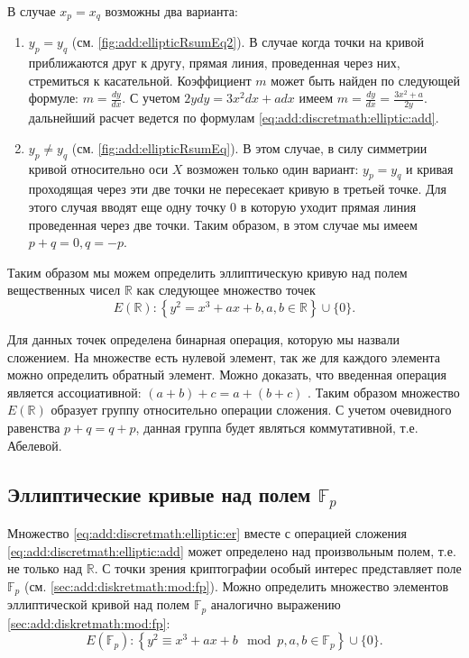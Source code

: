 В случае $x_p = x_q$ возможны два варианта:
\begin{enumerate}
\item $y_p = y_q$ (см. \autoref{fig:add:ellipticRsumEq2}). В случае
  когда точки на кривой приближаются друг к другу, прямая линия,
  проведенная через них, стремиться к касательной. Коэффициент $m$
  может быть найден по следующей формуле: $m = \frac{dy}{dx}$. С
  учетом $2ydy = 3x^2 dx + a dx$ имеем $m = \frac{dy}{dx} = \frac{3
    x^2 + a}{2y}$. дальнейший расчет ведется по формулам
  \eqref{eq:add:discretmath:elliptic:add}. 
\item $y_p \ne y_q$ (см. \autoref{fig:add:ellipticRsumEq}). В этом
  случае, в силу симметрии кривой относительно оси $X$ возможен только
  один вариант: $y_p = y_q$ и кривая проходящая через эти две точки не
  пересекает кривую в третьей точке. Для этого случая вводят еще одну
  точку $0$ в которую уходит прямая линия проведенная через две точки.
  Таким образом, в этом случае мы имеем $p + q = 0, q = -p$.
\end{enumerate}

Таким образом мы можем определить эллиптическую кривую над полем
вещественных чисел $\mathbb{R}$ как следующее множество точек
\begin{equation}
E\left(\mathbb{R}\right) : \left\{
y^2 = x^3 +ax +b, a,b \in \mathbb{R}
\right\} \cup \{0\}.
\label{eq:add:discretmath:elliptic:er}
\end{equation}

Для данных точек определена бинарная операция, которую мы назвали
сложением. На множестве есть нулевой элемент, так же для каждого
элемента можно определить обратный элемент. Можно доказать, что
введенная операция является ассоциативной: $(a+b) + c = a + (b+c)$
\cite{Washington:2008:ECN:1388394}. Таким образом множество
$E\left(\mathbb{R}\right)$ образует группу относительно операции
сложения. С учетом очевидного равенства $p + q = q + p$, данная группа
будет являться коммутативной, т.е. Абелевой. 


\subsection{Эллиптические кривые над полем $\mathbb{F}_p$}
Множество \eqref{eq:add:discretmath:elliptic:er} вместе с операцией
сложения \eqref{eq:add:discretmath:elliptic:add} может определено над
произвольным полем, т.е. не только над $\mathbb{R}$. С точки зрения
криптографии особый интерес представляет поле $\mathbb{F}_p$ (см.
\autoref{sec:add:diskretmath:mod:fp}). Можно определить множество
элементов эллиптической кривой над полем $\mathbb{F}_p$ аналогично
выражению \eqref{sec:add:diskretmath:mod:fp}:
\begin{equation}
E\left(\mathbb{F}_p\right) : \left\{
y^2 \equiv x^3 +ax +b \mod p, a,b \in \mathbb{F}_p
\right\} \cup \{0\}.
\label{eq:add:discretmath:elliptic:fp}
\end{equation}

